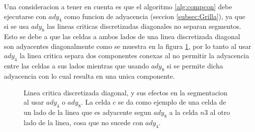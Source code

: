 Una consideracion a tener en cuenta es que el algoritmo \ref{alg:compcon} debe
ejecutarse con $ady_4$ como funcion de adyacencia (seccion
\ref{subsec:Grilla}), ya que si se usa $ady_8$ las lineas criticas
discretizadas diagonales no separan segmentos. Esto se debe a que las celdas a ambos lados de una linea
discretizada diagonal son adyacentes diagonalmente como se muestra en la figura
\ref{fig:probDiagSeg}, por lo tanto al usar $ady_4$ la linea critica separa dos
componentes conexas al no permitir la adyacencia entre las celdas a sus lados
mientras que usando $ady_8$ si se permite dicha adyacencia con lo cual resulta
en una unica componente.

\begin{figure}[H]
  \centerfloat


  \qquad

  \caption[Linea critica discretizada diagonal, y sus efectos en la
  segmentacion al usar $ady_4$ o $ady_8$.]{Linea critica discretizada diagonal, y sus efectos en la
  segmentacion al usar $ady_4$ o $ady_8$. La celda $c$ se da como ejemplo de
una celda de un lado de la linea que es adyacente segun $ady_8$ a la celda $n3$ al 
otro lado de la linea, cosa que no sucede con $ady_4$.}\label{fig:probDiagSeg}

\end{figure}

